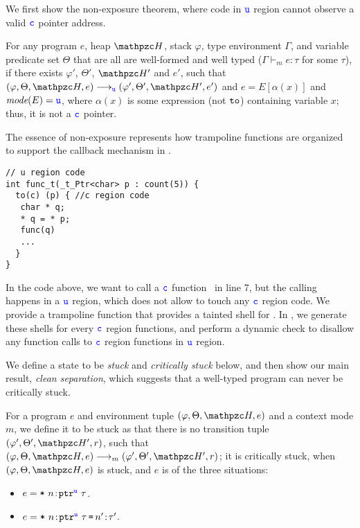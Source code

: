 We first show the non-exposure theorem,
where code in $\textcolor{blue}{\texttt{u}}$ region cannot observe a valid $\textcolor{blue}{\texttt{c}}$ pointer address.

\begin{thm}
For any \lang program $e$, heap $\heap$, stack
$\varphi$, type environment $\Gamma$, and variable predicate set $\Theta$
that are all are well-formed and well
typed ($\Gamma\vdash_{m} e : \tau$ for some $\tau$), if there exists $\varphi'$, $\Theta'$,
$\heap'$ and $e'$, such that $(\varphi,\Theta,\heap,e)
\longrightarrow_{\umode} (\varphi',\Theta',\heap',e')$ and $e=E[\alpha(x)]$ and $\textit{mode}(E)=\textcolor{blue}{\texttt{u}}$,
where $\alpha(x)$ is some expression (not $\mathtt{to}$) containing variable $x$; 
thus, it is not a $\textcolor{blue}{\texttt{c}}$ pointer.
\end{thm}

The essence of non-exposure represents how trampoline functions are organized to support the callback mechanism in \systemname.

\begin{verbatim}
// u region code
int func_t(_t_Ptr<char> p : count(5)) {
  to(c) (p) { //c region code
   char * q;
   * q = * p;
   func(q)
   ... 
  }
}
\end{verbatim}

In the code above, we want to call a $\textcolor{blue}{\texttt{c}}$ function~ in line 7, but the calling happens in a $\textcolor{blue}{\texttt{u}}$ region, which does not allow to touch any $\textcolor{blue}{\texttt{c}}$ region code. We provide a trampoline function that provides a tainted shell  for . In \systemname, we generate these shells for every $\textcolor{blue}{\texttt{c}}$ region functions, and perform a dynamic check to disallow any function calls to $\textcolor{blue}{\texttt{c}}$ region functions in $\textcolor{blue}{\texttt{u}}$ region.

We define a state to be \emph{stuck} and \emph{critically stuck} below, and then show our main result, {\em clean separation},
which suggests that a well-typed program can never be critically stuck.

\begin{defi}\label{type-stuck}
For a program $e$ and environment tuple $(\varphi,\Theta,\heap,e)$ and a context mode $m$, we define it to be stuck as that there is no transition tuple $(\varphi',\Theta',\heap',r)$, such that $(\varphi,\Theta,\heap,e) \longrightarrow_m (\varphi',\Theta',\heap',r)$;
it is critically stuck, when $(\varphi,\Theta,\heap,e)$ is stuck, and $e$ is of the three situations:
\begin{itemize}

\item $e=\texttt{*}~{{n}\!:\!{\mathtt{ptr}^{\textcolor{blue}{\texttt{u}}}~{\tau}}}$.

\item $e=\texttt{*}~{{n}\!:\!{\mathtt{ptr}^{\textcolor{blue}{\texttt{u}}}~{\tau}}}\,\texttt{=}\, {{n'}\!:\!{\tau'}}$.

\end{itemize}
\end{defi}

